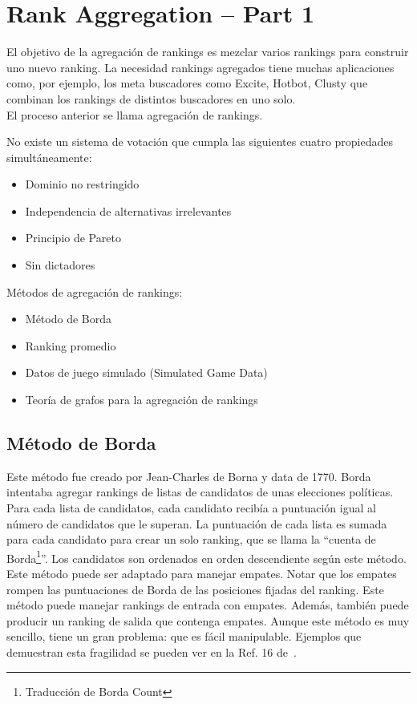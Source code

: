 \section{Rank Aggregation -- Part 1 \cite{langville2012s}}

El objetivo de la agregación de rankings es mezclar varios rankings para construir uno nuevo ranking. La necesidad rankings agregados tiene muchas aplicaciones como, por ejemplo, los meta buscadores como Excite, Hotbot, Clusty que combinan los rankings de distintos buscadores en uno solo.\\

El proceso anterior se llama agregación de rankings.\\

\begin{teo}
No existe un sistema de votación que cumpla las siguientes cuatro propiedades simultáneamente:

\begin{itemize}
\item Dominio no restringido
\item Independencia de alternativas irrelevantes
\item Principio de Pareto
\item Sin dictadores
\end{itemize}
\end{teo}

Métodos de agregación de rankings:
\begin{itemize}
\item Método de Borda
\item Ranking promedio
\item Datos de juego simulado (Simulated Game Data)
\item Teoría de grafos para la agregación de rankings
\end{itemize}

\subsection{Método de Borda}

Este método fue creado por Jean-Charles de Borna y data de 1770. Borda intentaba agregar rankings de listas de candidatos de unas elecciones políticas. Para cada lista de candidatos, cada candidato recibía a puntuación igual al número de candidatos que le superan. La puntuación de cada lista es sumada para cada candidato para crear un solo ranking, que se llama la ``cuenta de Borda\footnote{Traducción de Borda Count}''. Los candidatos son ordenados en orden descendiente según este método. Este método puede ser adaptado para  manejar empates. Notar que los empates rompen las puntuaciones de Borda de las posiciones fijadas del ranking. Este método puede manejar rankings de entrada con empates. Además, también puede producir un ranking de salida que contenga empates. Aunque este método es muy sencillo, tiene un gran problema: que es fácil manipulable. Ejemplos que demuestran esta fragilidad se pueden ver en la Ref. 16 de~\cite{langville2012s}.

